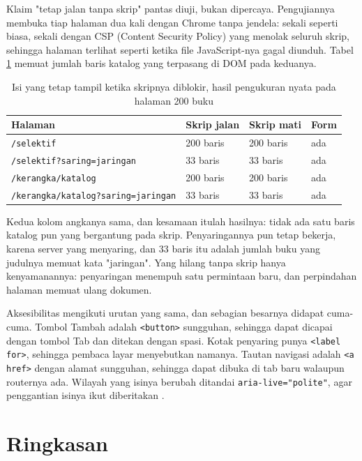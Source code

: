 Klaim "tetap jalan tanpa skrip" pantas diuji, bukan dipercaya. Pengujiannya
membuka tiap halaman dua kali dengan Chrome tanpa jendela: sekali seperti
biasa, sekali dengan CSP (Content Security Policy) yang menolak seluruh
skrip, sehingga halaman terlihat seperti ketika file JavaScript-nya gagal
diunduh. Tabel \ref{tab:tanpa-js} memuat jumlah baris katalog yang terpasang
di DOM pada keduanya.

\begin{table}[!htb]
  \centering
  \caption{Isi yang tetap tampil ketika skripnya diblokir, hasil pengukuran
           nyata pada halaman 200 buku}
  \label{tab:tanpa-js}
  \begin{tabularx}{\textwidth}{Xlll}
    \hline
    \textbf{Halaman} & \textbf{Skrip jalan} & \textbf{Skrip mati} & \textbf{Form} \\
    \hline
    \texttt{/selektif} & 200 baris & 200 baris & ada \\
    \hline
    \texttt{/selektif?saring=jaringan} & 33 baris & 33 baris & ada \\
    \hline
    \texttt{/kerangka/katalog} & 200 baris & 200 baris & ada \\
    \hline
    \texttt{/kerangka/katalog?saring=jaringan} & 33 baris & 33 baris & ada \\
    \hline
  \end{tabularx}
\end{table}

Kedua kolom angkanya sama, dan kesamaan itulah hasilnya: tidak ada satu baris
katalog pun yang bergantung pada skrip. Penyaringannya pun tetap bekerja,
karena server yang menyaring, dan 33 baris itu adalah jumlah buku yang
judulnya memuat kata "jaringan". Yang hilang tanpa skrip hanya kenyamanannya:
penyaringan menempuh satu permintaan baru, dan perpindahan halaman memuat
ulang dokumen.

Aksesibilitas mengikuti urutan yang sama, dan sebagian besarnya didapat
cuma-cuma. Tombol Tambah adalah \texttt{<button>} sungguhan, sehingga dapat
dicapai dengan tombol Tab dan ditekan dengan spasi. Kotak penyaring punya
\texttt{<label for>}, sehingga pembaca layar menyebutkan namanya. Tautan
navigasi adalah \texttt{<a href>} dengan alamat sungguhan, sehingga dapat
dibuka di tab baru walaupun routernya ada. Wilayah yang isinya berubah
ditandai \texttt{aria-live="polite"}, agar penggantian isinya ikut
diberitakan \cite{w3c-wcag22}.

\section{Ringkasan}

